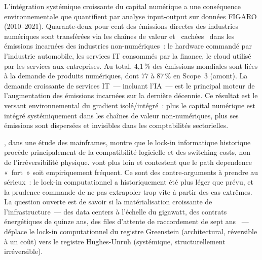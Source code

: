 L'intégration systémique croissante du capital numérique a une conséquence environnementale que \textcite{axenbeck_global_2025} quantifient par analyse input-output sur données FIGARO (2010--2021). Quarante-deux pour cent des émissions directes des industries numériques sont transférées via les chaînes de valeur et \og~cachées~\fg{} dans les émissions incarnées des industries non-numériques~: le hardware commandé par l'industrie automobile, les services IT consommés par la finance, le cloud utilisé par les services aux entreprises. Au total, 4,1\,\% des émissions mondiales sont liées à la demande de produits numériques, dont 77 à 87\,\% en Scope~3 (amont). La demande croissante de services IT~--- incluant l'IA~--- est le principal moteur de l'augmentation des émissions incarnées sur la dernière décennie. Ce résultat est le versant environnemental du gradient isolé/intégré~: plus le capital numérique est intégré systémiquement dans les chaînes de valeur non-numériques, plus ses émissions sont dispersées et invisibles dans les comptabilités sectorielles.

\textcite{greenstein_lock_in_1997}, dans une étude des mainframes, montre que le lock-in informatique historique procède principalement de la compatibilité logicielle et des switching costs, non de l'irréversibilité physique. \textcite{liebowitz_margolis_1995} vont plus loin et contestent que le path dependence «~fort~» soit empiriquement fréquent. Ce sont des contre-arguments à prendre au sérieux~: le lock-in computationnel a historiquement été plus léger que prévu, et la prudence commande de ne pas extrapoler trop vite à partir des cas extrêmes. La question ouverte est de savoir si la matérialisation croissante de l'infrastructure~--- des data centers à l'échelle du gigawatt, des contrats énergétiques de quinze ans, des files d'attente de raccordement de sept ans \parencite{fang_greenstein_2020}~--- déplace le lock-in computationnel du registre Greenstein (architectural, réversible à un coût) vers le registre Hughes-Unruh (systémique, structurellement irréversible).

